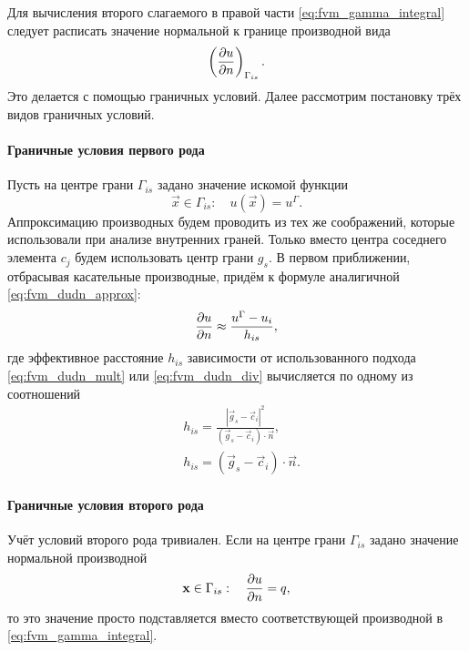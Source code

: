 Для вычисления второго слагаемого в правой части 
\cref{eq:fvm_gamma_integral}
следует расписать значение нормальной 
к границе производной вида
$$
\left(\frac{\partial u}{\partial n}\right)_{\Gamma_{is}}.
$$
Это делается с помощью граничных условий.
Далее рассмотрим постановку трёх видов граничных условий.

\paragraph{Граничные условия первого рода}
Пусть на центре грани $\Gamma_{is}$ задано 
значение искомой функции
\begin{equation*}
\vec x \in \Gamma_{is}: \quad u(\vec x) = u^\Gamma.
\end{equation*}
Аппроксимацию производных
будем проводить из тех же соображений, которые использовали
при анализе внутренних граней. Только вместо центра соседнего элемента
$c_j$ будем использовать центр грани $g_s$.
В первом приближении, отбрасывая касательные производные, придём к формуле аналигичной \cref{eq:fvm_dudn_approx}:
\begin{equation}
\label{eq:fvm_bc1_approx}
\frac{\partial u}{\partial n} \approx \frac{u^\Gamma - u_i}{h_{is}},
\end{equation}
где эффективное расстояние $h_{is}$ зависимости от использованного подхода \cref{eq:fvm_dudn_mult} или \cref{eq:fvm_dudn_div}
вычисляется по одному из соотношений
\begin{align}
\label{eq:fvm_dudn_bc_mult}
&h_{is} = \frac{|\vec g_s - \vec c_i|^2}{(\vec g_s - \vec c_i)\cdot \vec n},
\\[10pt]
\label{eq:fvm_dudn_bc_div}
&h_{is} = (\vec g_s - \vec c_i)\cdot \vec n.
\end{align}

\paragraph{Граничные условия второго рода}
Учёт условий второго рода тривиален.
Если на центре грани $\Gamma_{is}$ задано 
значение нормальной производной
\begin{equation}
\label{eq:fvm_bc2_approx}
\boldsymbol{\rm x} \in \Gamma_{is}: \quad \frac{\partial u}{\partial n} = q,
\end{equation}
то это значение просто подставляется вместо соответствующей производной
в  \cref{eq:fvm_gamma_integral}.

